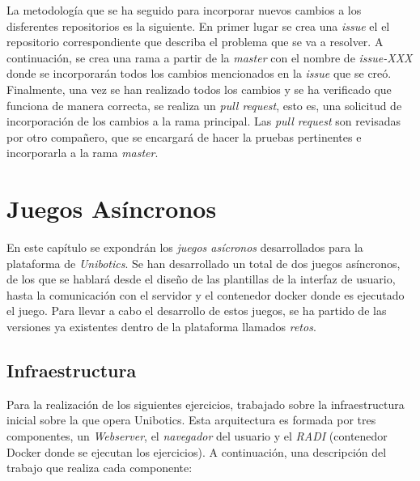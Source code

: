 \documentclass[a4paper, 12pt]{book}
\begin{document}
La metodología que se ha seguido para incorporar nuevos cambios a los disferentes repositorios es la siguiente. En primer lugar se crea una \emph{issue} el el repositorio correspondiente que describa el problema que se va a resolver. A continuación, se crea una rama a partir de la \emph{master} con el nombre de \emph{issue-XXX} donde se incorporarán todos los cambios mencionados en la \emph{issue} que se creó. Finalmente, una vez se han realizado todos los cambios y se ha verificado que funciona de manera correcta, se realiza un \emph{pull request}, esto es, una solicitud de incorporación de los cambios a la rama principal. Las \emph{pull request} son revisadas por otro compañero, que se encargará de hacer la pruebas pertinentes e incorporarla a la rama \emph{master}.


\cleardoublepage
\chapter{Juegos Asíncronos}

En este capítulo se expondrán los \emph{juegos asícronos} desarrollados para la plataforma de \textit{Unibotics}. Se han desarrollado un total de dos juegos asíncronos, de los que se hablará desde el diseño de las plantillas de la interfaz de usuario, hasta la comunicación con el servidor y el contenedor docker donde es ejecutado el juego. Para llevar a cabo el desarrollo de estos juegos, se ha partido de las versiones ya existentes dentro de la plataforma llamados \emph{retos}.

\section{Infraestructura}
\label{sec:async_infraestructura}

Para la realización de los siguientes ejercicios, trabajado sobre la infraestructura inicial sobre la que opera Unibotics. Esta arquitectura es formada por tres componentes, un \emph{Webserver}, el \emph{navegador} del usuario y el \emph{RADI} (contenedor Docker donde se ejecutan los ejercicios). A continuación, una descripción del trabajo que realiza cada componente:
\end{document}
